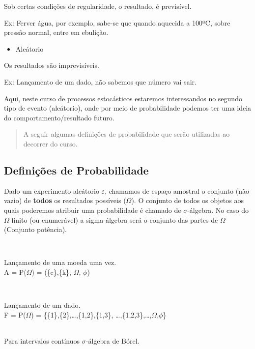 \documentclass[]{article}
\providecommand{\tightlist}{%
  \setlength{\itemsep}{0pt}\setlength{\parskip}{0pt}}
\theoremstyle{definition}
\theoremstyle{definition}
\theoremstyle{definition}
\theoremstyle{remark}
\let\BeginKnitrBlock\begin \let\EndKnitrBlock\end
\begin{document}
Sob certas condições de regularidade, o resultado, é previsível.

Ex: Ferver água, por exemplo, sabe-se que quando aquecida a 100ºC, sobre
pressão normal, entre em ebulição.

\begin{itemize}
\tightlist
\item
  Aleátorio
\end{itemize}

Os resultados são imprevisíveis.

Ex: Lançamento de um dado, não sabemos que número vai sair.

Aqui, neste curso de processos estocásticos estaremos interessandos no
segundo tipo de evento (aleátorio), onde por meio de probabilidade
podemos ter uma ideia do comportamento/resultado futuro.

\begin{quote}
A seguir algumas definições de probabilidade que serão utilizadas ao
decorrer do curso.
\end{quote}

\subsection{Definições de
Probabilidade}\label{definicoes-de-probabilidade}

\BeginKnitrBlock{definition}
\protect\hypertarget{def:probabilidade}{}{\label{def:probabilidade} }Dado um
experimento aleátorio \(\varepsilon\), chamamos de espaço amostral o
conjunto (não vazio) de \textbf{todos} os resultados possíveis
(\(\Omega\)). O conjunto de todos os objetos aos quais poderemos
atribuir uma probabilidade é chamado de \(\sigma\)-álgebra. No caso do
\(\Omega\) finito (ou enumerável) a sigma-álgebra será o conjunto das
partes de \(\Omega\) (Conjunto potência).
\EndKnitrBlock{definition}\\
\BeginKnitrBlock{example}
\protect\hypertarget{exm:unnamed-chunk-1}{}{\label{exm:unnamed-chunk-1}
}Lançamento de uma moeda uma vez.\\
A = P(\(\Omega\)) = (\{c\},\{k\}, \(\Omega\), \(\phi\))
\EndKnitrBlock{example}\\
\BeginKnitrBlock{example}
\protect\hypertarget{exm:unnamed-chunk-2}{}{\label{exm:unnamed-chunk-2}
}Lançamento de um dado.\\
F = P(\(\Omega\)) = \{\{1\},\{2\},\ldots{},\{1,2\},\{1,3\},
\ldots{},\{1,2,3\},\ldots{},\(\Omega\),\(\phi\)\}
\EndKnitrBlock{example}\\
Para intervalos contínuos \(\sigma\)-álgebra de Bórel.
\end{document}
